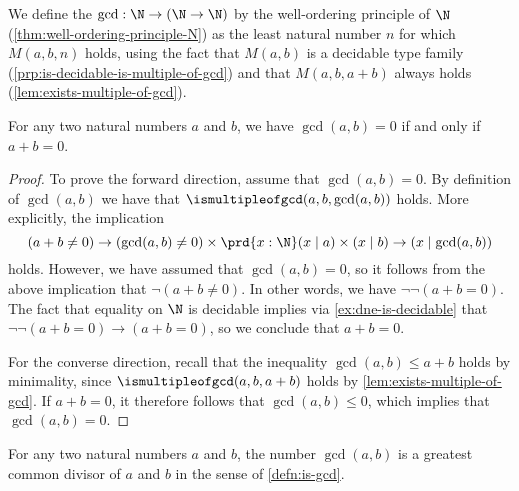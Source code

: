 \begin{defn}\label{defn:gcd}
  We define the  $\gcd:\N\to (\N\to\N)$ by the well-ordering principle of $\N$ (\cref{thm:well-ordering-principle-N}) as the least natural number $n$ for which $M(a,b,n)$ holds, using the fact that $M(a,b)$ is a decidable type family (\cref{prp:is-decidable-is-multiple-of-gcd}) and that $M(a,b,a+b)$ always holds (\cref{lem:exists-multiple-of-gcd}).
\end{defn}

\begin{lem}\label{lem:is-zero-gcd}
  For any two natural numbers $a$ and $b$, we have $\gcd(a,b)=0$ if and only if $a+b=0$.
\end{lem}

\begin{proof}
  To prove the forward direction, assume that $\gcd(a,b)=0$. By definition of $\gcd(a,b)$ we have that $\ismultipleofgcd(a,b,\gcd(a,b))$ holds. More explicitly, the implication
  \begin{equation*}
    (a+b\neq 0)\to (\gcd(a,b)\neq 0)\times \prd{x:\N}(x\mid a)\times(x\mid b)\to (x\mid\gcd(a,b))
  \end{equation*}
  holds. However, we have assumed that $\gcd(a,b)=0$, so it follows from the above implication that $\neg(a+b\neq 0)$. In other words, we have $\neg\neg(a+b=0)$. The fact that equality on $\N$ is decidable implies via \cref{ex:dne-is-decidable} that $\neg\neg(a+b=0)\to (a+b=0)$, so we conclude that $a+b=0$.

  For the converse direction, recall that the inequality $\gcd(a,b)\leq a+b$ holds by minimality, since $\ismultipleofgcd(a,b,a+b)$ holds by \cref{lem:exists-multiple-of-gcd}. If $a+b=0$, it therefore follows that $\gcd(a,b)\leq 0$, which implies that $\gcd(a,b)=0$.
\end{proof}

\begin{thm}
  For any two natural numbers $a$ and $b$, the number $\gcd(a,b)$ is a greatest common divisor of $a$ and $b$ in the sense of \cref{defn:is-gcd}.
\end{thm}

